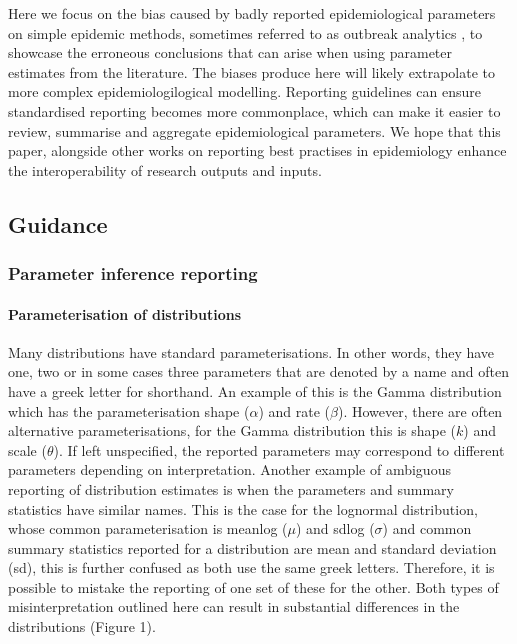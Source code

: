 \documentclass[
  10pt,
  letterpaper,
]{article}
\begin{document}
Here we focus on the bias caused by badly reported epidemiological
parameters on simple epidemic methods, sometimes referred to as outbreak
analytics \citep[sensu][]{polonskyOutbreakAnalyticsDeveloping2019}, to
showcase the erroneous conclusions that can arise when using parameter
estimates from the literature. The biases produce here will likely
extrapolate to more complex epidemiologilogical modelling. Reporting
guidelines can ensure standardised reporting becomes more commonplace,
which can make it easier to review, summarise and aggregate
epidemiological parameters. We hope that this paper, alongside other
works on reporting best practises in epidemiology
\citep{pollettRecommendedReportingItems2021, charnigaBestPracticesEstimating2024}
enhance the interoperability of research outputs and inputs.

\subsection{Guidance}\label{guidance}

\subsubsection{Parameter inference
reporting}\label{parameter-inference-reporting}

\paragraph{Parameterisation of
distributions}\label{parameterisation-of-distributions}

Many distributions have standard parameterisations. In other words, they
have one, two or in some cases three parameters that are denoted by a
name and often have a greek letter for shorthand. An example of this is
the Gamma distribution which has the parameterisation shape (\(\alpha\))
and rate (\(\beta\)). However, there are often alternative
parameterisations, for the Gamma distribution this is shape (\(k\)) and
scale (\(\theta\)). If left unspecified, the reported parameters may
correspond to different parameters depending on interpretation. Another
example of ambiguous reporting of distribution estimates is when the
parameters and summary statistics have similar names. This is the case
for the lognormal distribution, whose common parameterisation is meanlog
(\(\mu\)) and sdlog (\(\sigma\)) and common summary statistics reported
for a distribution are mean and standard deviation (sd), this is further
confused as both use the same greek letters. Therefore, it is possible
to mistake the reporting of one set of these for the other. Both types
of misinterpretation outlined here can result in substantial differences
in the distributions (Figure 1).
\end{document}
